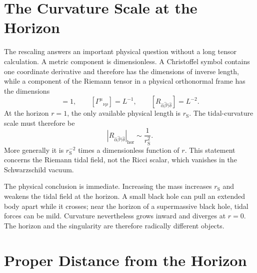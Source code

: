 \begin{classroomqa}
\end{classroomqa}

\section{The Curvature Scale at the Horizon}

The rescaling answers an important physical question without a long tensor
calculation.  A metric component is dimensionless.  A Christoffel symbol
contains one coordinate derivative and therefore has the dimensions of
inverse length, while a component of the Riemann tensor in a physical
orthonormal frame has the dimensions
\begin{equation}
[g_{\mu\nu}]=1,
\qquad
[\Gamma^\mu{}_{\nu\rho}]=L^{-1},
\qquad
[R_{\hat\alpha\hat\beta\hat\gamma\hat\delta}]
=L^{-2}.
\label{eq:l7-curvature-dimensions}
\end{equation}
At the horizon \(r=1\), the only available physical length is
\(r_{\mathrm S}\).  The tidal-curvature scale must therefore be
\begin{equation}
\left|R_{\hat\alpha\hat\beta\hat\gamma\hat\delta}\right|_{\mathrm{hor}}
\sim \frac{1}{r_{\mathrm S}^2}.
\label{eq:l7-horizon-curvature}
\end{equation}
More generally it is \(r_{\mathrm S}^{-2}\) times a dimensionless function of
\(r\).  This statement concerns the Riemann tidal field, not the Ricci scalar,
which vanishes in the Schwarzschild vacuum.

The physical conclusion is immediate.  Increasing the mass increases
\(r_{\mathrm S}\) and weakens the tidal field at the horizon.  A small black
hole can pull an extended body apart while it crosses; near the horizon of a
supermassive black hole, tidal forces can be mild.  Curvature nevertheless
grows inward and diverges at \(r=0\).  The horizon and the singularity are
therefore radically different objects.

\section{Proper Distance from the Horizon}

